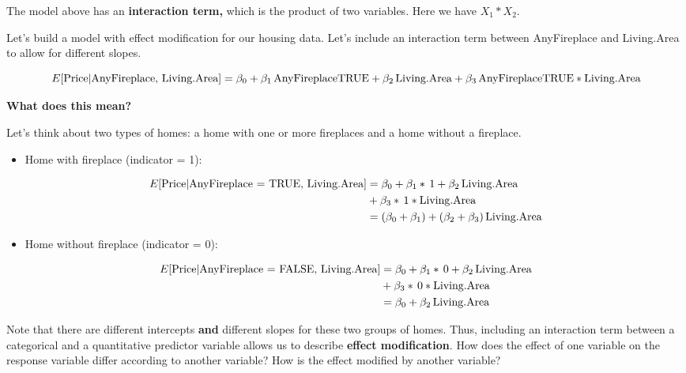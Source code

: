 \documentclass[
]{book}
\providecommand{\tightlist}{%
  \setlength{\itemsep}{0pt}\setlength{\parskip}{0pt}}
\begin{document}
The model above has an \textbf{interaction term,} which is the product of two variables. Here we have \(X_1*X_2\).

Let's build a model with effect modification for our housing data. Let's include an interaction term between AnyFireplace and Living.Area to allow for different slopes.

\[E[\hbox{Price}| \hbox{AnyFireplace, Living.Area}] = \beta_0+ \beta_1\,\hbox{AnyFireplaceTRUE}\\ + \beta_2\,\hbox{Living.Area} + \beta_3\,\hbox{AnyFireplaceTRUE}*\hbox{Living.Area}\]

\textbf{What does this mean?}

Let's think about two types of homes: a home with one or more fireplaces and a home without a fireplace.

\begin{itemize}
\tightlist
\item
  Home with fireplace (indicator = 1):
\end{itemize}

\begin{align*}
E[\hbox{Price}| \hbox{AnyFireplace = TRUE, Living.Area}] &= \beta_0 + \beta_1*\,1 + \beta_2\,\hbox{Living.Area}\\
& + \beta_3*\,1*\hbox{Living.Area}\\
&= (\beta_0 + \beta_1) + (\beta_2+\beta_3)\,\hbox{Living.Area}\\
\end{align*}

\begin{itemize}
\tightlist
\item
  Home without fireplace (indicator = 0):
\end{itemize}

\begin{align*}
E[\hbox{Price}| \hbox{AnyFireplace = FALSE, Living.Area}] &= \beta_0 + \beta_1*\,0 + \beta_2\,\hbox{Living.Area}\\
&+ \beta_3*\,0*\hbox{Living.Area}\\
&= \beta_0  + \beta_2\,\hbox{Living.Area}\\
\end{align*}

Note that there are different intercepts \textbf{and} different slopes for these two groups of homes. Thus, including an interaction term between a categorical and a quantitative predictor variable allows us to describe \textbf{effect modification}. How does the effect of one variable on the response variable differ according to another variable? How is the effect modified by another variable?
\end{document}
